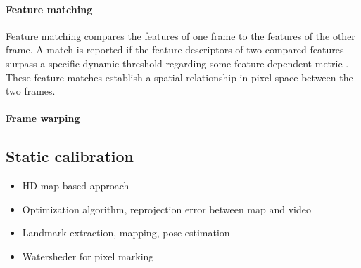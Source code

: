 \paragraph{Feature matching}
Feature matching compares the features of one frame to the features of the other frame.
A match is reported if the feature descriptors of two compared features surpass a specific dynamic
threshold \cite{lowe10.1023/B:VISI.0000029664.99615.94} regarding some feature
dependent metric \cite{kumar2014survey}.
These feature matches establish a spatial relationship in pixel space between the two frames.

\paragraph{Frame warping}



\subsection{Static calibration}
\begin{itemize}
  \item HD map based approach
  \item Optimization algorithm, reprojection error between map and video 
  \item Landmark extraction, mapping, pose estimation
  \item Watersheder for pixel marking
\end{itemize}